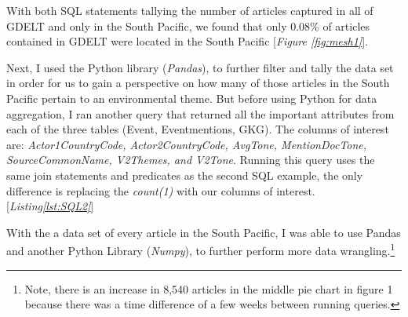 \documentclass[12pt]{article}
\begin{document}


With both SQL statements tallying the number of articles captured in all of GDELT and only in the South Pacific, we found that only 0.08\% of articles contained in GDELT were located in the South Pacific [\textit{Figure \ref{fig:mesh1}}]. 

Next, I used the Python library (\textit{Pandas}), to further filter and tally the data set in order for us to gain a perspective on how many of those articles in the South Pacific pertain to an environmental theme. But before using Python for data aggregation, I ran another query that returned all the important attributes from each of the three tables (Event, Eventmentions, GKG). The columns of interest are: \textit{Actor1CountryCode, Actor2CountryCode, AvgTone, MentionDocTone, SourceCommonName, V2Themes, and V2Tone}. Running this query uses the same join statements and predicates as the second SQL example, the only difference is replacing the \textit{count(1)} with our columns of interest. [\textit{Listing\ref{lst:SQL2}}]

With the a data set of every article in the South Pacific, I was able to use Pandas and another Python Library (\textit{Numpy}), to further perform more data wrangling.\footnote{Note, there is an increase in 8,540 articles in the middle pie chart in figure 1 because there was a time difference of a few weeks between running queries.}

\end{document}
